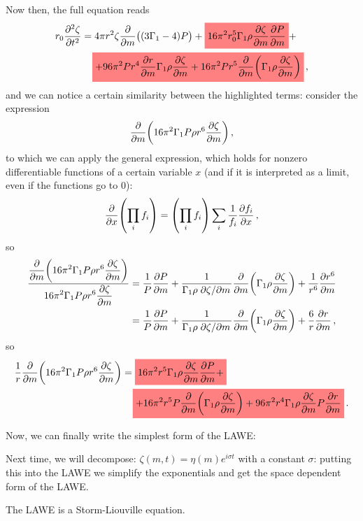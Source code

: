 \documentclass[main.tex]{subfiles}
\begin{document}
Now then, the full equation reads 
%
\begin{align}
\begin{split}
r_0 \pdv[2]{\zeta }{t} &= 
4 \pi r^2 \zeta \pdv{}{m} \qty((3\Gamma_1 -4) P) 
+ \hlc{red}{16 \pi^2 r_0^5 \Gamma_1 \rho \pdv{\zeta }{m} \pdv{P}{m}} + \\
&\phantom{=}\ 
\hlc{red}{+ 96 \pi^2 P r^4 \pdv{r}{m} \Gamma_1 \rho \pdv{\zeta }{m}
+ 16 \pi^2 P r^5 \pdv{}{m} \qty(\Gamma_1 \rho \pdv{\zeta }{m})}
\,,
\end{split}
\end{align}
%
and we can notice a certain similarity between the highlighted terms: consider the expression 
%
\begin{align}
\pdv{}{m} \qty(16 \pi^2 \Gamma_1 P \rho r^{6} \pdv{\zeta }{m})
\,,
\end{align}
to which we can apply the general expression, which holds for nonzero differentiable functions of a certain variable \(x\) (and if it is interpreted as a limit, even if the functions go to 0): 
%
\begin{align}
\pdv{}{x} \qty(\prod_i f_i) 
= \qty(\prod_i f_i) \sum_i \frac{1}{f_i} \pdv{f_i}{x}
\,,
\end{align}
%
so 
%
\begin{align}
\frac{\displaystyle\pdv{}{m} \qty(16 \pi^2 \Gamma_1 P \rho r^{6} \pdv{\zeta }{m})}{\displaystyle 16 \pi^2 \Gamma_1 P \rho r^{6} \pdv{\zeta }{m}} &= 
\frac{1}{P} \pdv{P}{m} 
+ \frac{1}{\Gamma_1 \rho \pdv*{\zeta }{m}} \pdv{}{m} \qty(\Gamma_1 \rho \pdv{\zeta }{m})
+ \frac{1}{r^{6}} \pdv{r^{6}}{m}  \\
&= \frac{1}{P} \pdv{P}{m} 
+ \frac{1}{\Gamma_1 \rho \pdv*{\zeta }{m}} \pdv{}{m} \qty(\Gamma_1 \rho \pdv{\zeta }{m})
+ \frac{6}{r} \pdv{r}{m} 
\,,
\end{align}
%
so 
%
\begin{align}
\begin{split}
\frac{1}{r} \pdv{}{m} \qty(16 \pi^2 \Gamma_1 P \rho r^{6} \pdv{\zeta }{m}) &= 
\hlc{red}{16 \pi^2 r^{5} \Gamma_1 \rho \pdv{\zeta }{m} \pdv{P}{m} +} \\
&\phantom{=}\ 
\hlc{red}{+ 16 \pi^2 r^{5} P \pdv{}{m} \qty(\Gamma_1 \rho \pdv{\zeta }{m}) + 96 \pi^2r^{4} \Gamma_1 \rho \pdv{\zeta }{m} P \pdv{r}{m}}
\,.
\end{split}
\end{align}

Now, we can finally write the simplest form of the LAWE:
%
\boxalign{
\begin{align}
r \pdv[2]{\zeta}{t} =
4 \pi r^2 \zeta \pdv{}{m} \qty((3 \Gamma_1 - 4)P)+
\frac{1}{r} \pdv{}{m} \qty(16 \pi^2 \Gamma_1 P \rho r^6 \pdv{\zeta}{m} )  
\,,
\end{align}}
%

Next time, we will decompose: \(\zeta(m, t) = \eta(m) e^{i \sigma t}\) with a constant \(\sigma\): putting this into the LAWE we simplify the exponentials and get the space dependent form of the LAWE.

The LAWE is a Storm-Liouville equation.
\end{document}
